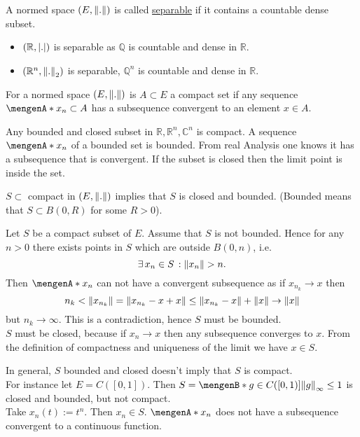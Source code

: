 \begin{definition*}[separable]
	A normed space $(E,\norm{.})$ is called \underline{separable} if it contains a countable dense subset.
\end{definition*}
\begin{beispiele}
	\begin{itemize}
		\item $(\mathbb{R},\lvert.\rvert)$ is separable as $\mathbb{Q}$ is countable and dense in $\mathbb{R}$.
		\item $(\mathbb{R}^n,\norm{.}_2)$ is separable, $\mathbb{Q}^n$ is countable and dense in $\mathbb{R}$.
	\end{itemize}
\end{beispiele}
\begin{definition*}
	For a normed space $(E,\norm{.})$ is $A \subset E$ a compact set if any sequence $\set{x_n} \subset A$ has a subsequence convergent to an element $x \in A$.
\end{definition*}
\begin{beispiel}
	 Any bounded and closed subset in $\mathbb{R}, \mathbb{R}^n, \mathbb{C}^n$ is compact. A sequence $\set{x_n}$ of a bounded set is bounded. From real Analysis one knows it has a subsequence that is convergent. If the subset is closed then the limit point is inside the set. 
\end{beispiel}
\begin{lemma*}
	$S \subset$ compact in $(E, \norm{.})$ implies that $S$ is closed and bounded. (Bounded means that $S \subset B(0,R)$ for some $R>0$).
\end{lemma*}
\begin{beweis}
	Let $S$ be a compact subset of $E$. Assume that $S$ is not bounded. Hence for any $n >0$ there exists points in $S$ which are outside $B(0,n)$, i.e. 
	\[
		\exists\, x_n \in S \,: \norm{x_n} >n.
	\]
	Then $\set{x_n}$ can not have a convergent subsequence as if $x_{n_k} \to x$ then
	\[
		n_k < \norm{x_{n_k}} = \norm{x_{n_k}-x + x} \leq \norm{x_{n_k}-x} + \norm{x} \to \norm{x}
	\]
	but $n_k \to \infty$. This is a contradiction, hence $S$ must be bounded. \\ $S$ must be closed, because if $x_n \to x$ then any subsequence converges to $x$. From the definition of compactness and uniqueness of the limit we have $x \in S$. \\
\end{beweis}
\begin{bemerkung}
	In general, $S$ bounded and closed doesn't imply that $S$ is compact. \\
For instance let $E= C([0,1])$. Then $S=\set[g \in C([0,1])]{\norm{g}_{\infty}\leq 1}$ is closed and bounded, but not compact. \\
Take $x_n(t):=t^n$. Then $x_n \in S$. $\set{x_n}$ does not have a subsequence convergent to a continuous function.
\end{bemerkung}
